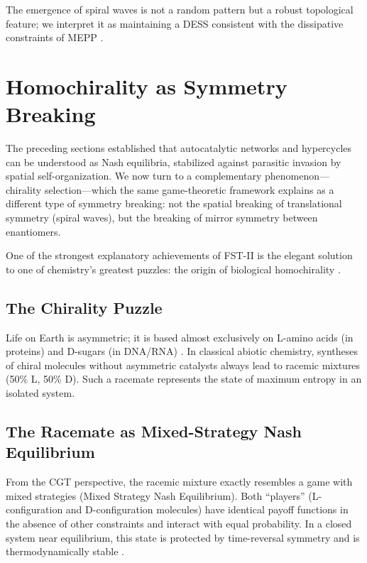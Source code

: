 \documentclass[12pt,a4paper]{article}
\theoremstyle{remark}
\begin{document}
The emergence of spiral waves is not a random pattern but a robust topological feature; we interpret it as maintaining a DESS consistent with the dissipative constraints of MEPP \citep{HypercycleInfinite}.

\section{Homochirality as Symmetry Breaking}
\label{sec:chirality}

The preceding sections established that autocatalytic networks and hypercycles can be understood as Nash equilibria, stabilized against parasitic invasion by spatial self-organization. We now turn to a complementary phenomenon---chirality selection---which the same game-theoretic framework explains as a different type of symmetry breaking: not the spatial breaking of translational symmetry (spiral waves), but the breaking of mirror symmetry between enantiomers.

One of the strongest explanatory achievements of FST-II is the elegant solution to one of chemistry's greatest puzzles: the origin of biological homochirality \citep{Blackmond2010,Biochirality}.

\subsection{The Chirality Puzzle}

Life on Earth is asymmetric; it is based almost exclusively on L-amino acids (in proteins) and D-sugars (in DNA/RNA) \citep{HomochiralityThermo}. In classical abiotic chemistry, syntheses of chiral molecules without asymmetric catalysts always lead to racemic mixtures (50\% L, 50\% D). Such a racemate represents the state of maximum entropy in an isolated system.

\subsection{The Racemate as Mixed-Strategy Nash Equilibrium}

From the CGT perspective, the racemic mixture exactly resembles a game with mixed strategies (Mixed Strategy Nash Equilibrium). Both ``players'' (L-configuration and D-configuration molecules) have identical payoff functions in the absence of other constraints and interact with equal probability. In a closed system near equilibrium, this state is protected by time-reversal symmetry and is thermodynamically stable \citep{PlassonReview2007,TimeReversalSymmetry}.
\end{document}
